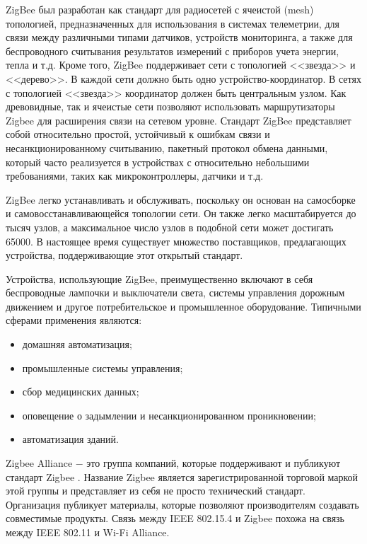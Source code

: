 	ZigBee был разработан как стандарт для радиосетей с ячеистой (mesh) топологией, предназначенных
	для использования в системах телеметрии, для связи между различными типами датчиков, устройств
	мониторинга, а также для беспроводного считывания результатов измерений с приборов учета энергии,
	тепла и т.д. Кроме того, ZigBee поддерживает сети с топологией <<звезда>> и <<дерево>>. В каждой 
	сети должно быть одно устройство-координатор. В сетях с топологией <<звезда>> координатор должен 
	быть центральным узлом. Как древовидные, так и ячеистые сети позволяют использовать маршрутизаторы 
	Zigbee для расширения связи на сетевом уровне.
	Стандарт ZigBee представляет собой относительно простой, устойчивый к ошибкам связи и
	несанкционированному считыванию, пакетный протокол обмена данными, который часто реализуется в
	устройствах с относительно небольшими требованиями, таких как микроконтроллеры, датчики и т.д.
	
	ZigBee легко устанавливать и обслуживать, поскольку он основан на самосборке и самовосстанавливающейся
	топологии сети. Он также легко масштабируется до тысяч узлов, а максимальное число узлов в подобной сети
	может достигать 65000. В настоящее время существует множество поставщиков, предлагающих устройства,
	поддерживающие этот открытый стандарт.
	
	Устройства, использующие ZigBee, преимущественно включают в себя беспроводные лампочки 
	и выключатели света, системы управления дорожным движением и другое потребительское и промышленное 
	оборудование. Типичными сферами применения являются:
	\begin{itemize}
		\item домашняя автоматизация;
		\item промышленные системы управления;
		\item сбор медицинских данных;
		\item оповещение о задымлении и несанкционированном проникновении;
		\item автоматизация зданий.
	\end{itemize}

	Zigbee Alliance $-$ это группа компаний, которые поддерживают и публикуют стандарт Zigbee
	 \cite{zigbee-alliance}. Название 
	Zigbee является зарегистрированной торговой маркой этой группы и представляет из себя не просто 
	технический стандарт. Организация публикует материалы, которые позволяют производителям 
	создавать совместимые продукты. Связь между IEEE 802.15.4 и Zigbee похожа на связь между 
	IEEE 802.11 и Wi-Fi Alliance.
	
